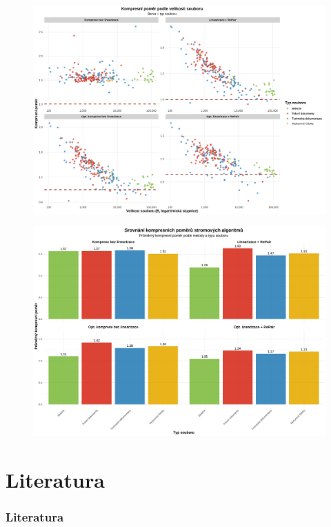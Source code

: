 \documentclass[lualatex,hyperref={pdfencoding=auto}]{beamer}
\begin{document}
\begin{frame}
  \begin{figure}
    \centering
    \includegraphics[width=\textwidth]{fig/compression_ratio_by_size_per_method.pdf}
    \label{fig:compression_ratio_by_size_per_method}
  \end{figure}
\end{frame}


\begin{frame}
  \begin{figure}
    \centering
    \includegraphics[width=\textwidth]{fig/presentation_overview.pdf}
    \label{fig:presentation_overview}
  \end{figure}
\end{frame}

\section{Literatura}
\begin{frame}[allowframebreaks]
    \frametitle{Literatura}
    \printbibliography[heading=none]
\end{frame}
\end{document}
